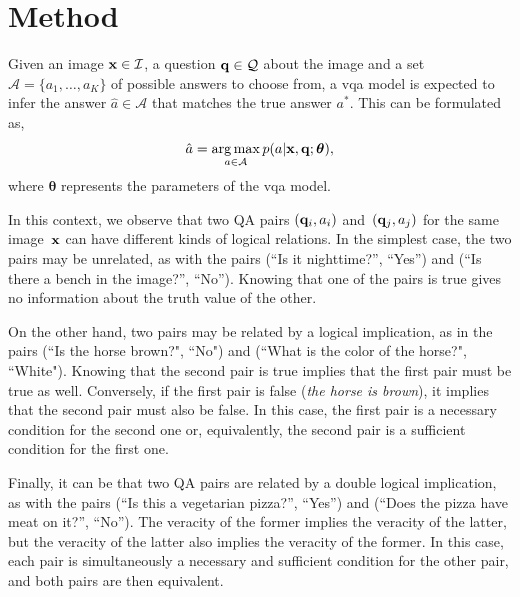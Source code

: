 \section{Method}


\label{sec:method}
Given an image $\mathbf{x} \in \mathcal{I}$, a question $\mathbf{q} \in \mathcal{Q}$ about the image and a set $\mathcal{A}=\{a_1,\ldots, a _K\}$ of possible answers to choose from, a \gls{vqa} model is expected to infer the answer $\hat{a} \in \mathcal{A}$ that matches the true answer $a^*$. This can be formulated as, 
\begin{equation}
    \hat{a} = \operatorname*{arg\,max}_{a \in \mathcal{A}} p(a | \mathbf{x},\mathbf{q}; \bm{\theta}),
    \label{eq:vqa}
\end{equation}
where $\bm{\theta}$ represents the parameters of the \gls{vqa} model.


In this context, we observe that two QA pairs $(\mathbf{q} _i, a_i)$ and~$(\mathbf{q}_j, a_j)$ for the same image~$\mathbf{x}$ can have different kinds of logical relations. In the simplest case, the two pairs may be unrelated, as with the pairs (``Is it nighttime?'', ``Yes'') and (``Is there a bench in the image?'', ``No''). Knowing that one of the pairs is true gives no information about the truth value of the other. 

On the other hand, two pairs may be related by a logical implication, as in the pairs (``Is the horse brown?", ``No") and (``What is the color of the horse?", ``White"). Knowing that the second pair is true implies that the first pair must be true as well. Conversely, if the first pair is false (\emph{the horse is brown}), it implies that the second pair must also be false. In this case, the first pair is a necessary condition for the second one or, equivalently, the second pair is a sufficient condition for the first one. 

Finally, it can be that two QA pairs are related by a double logical implication, as with the pairs (``Is this a vegetarian pizza?'', ``Yes'') and (``Does the pizza have meat on it?'', ``No''). The veracity of the former implies the veracity of the latter, but the veracity of the latter also implies the veracity of the former. In this case, each pair is simultaneously a necessary and sufficient condition for the other pair, and both pairs are then equivalent. 

